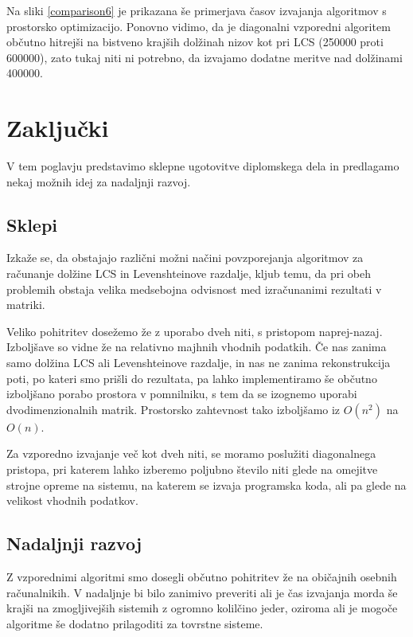 \documentclass[a4paper,12pt,openright]{book}
\begin{document}
Na sliki \ref{comparison6} je prikazana še primerjava časov izvajanja algoritmov s prostorsko optimizacijo. Ponovno vidimo, da je diagonalni vzporedni algoritem občutno hitrejši na bistveno krajših dolžinah nizov kot pri LCS (250000 proti 600000), zato tukaj niti ni potrebno, da izvajamo dodatne meritve nad dolžinami 400000. 



\chapter{Zaključki}

V tem poglavju predstavimo sklepne ugotovitve diplomskega dela in predlagamo nekaj možnih idej za nadaljnji razvoj.

\section{Sklepi}

Izkaže se, da obstajajo različni možni načini povzporejanja algoritmov za računanje dolžine LCS in Levenshteinove razdalje, kljub temu, da pri obeh problemih obstaja velika medsebojna odvisnost med izračunanimi rezultati v matriki. 

Veliko pohitritev dosežemo že z uporabo dveh niti, s pristopom naprej-nazaj. Izboljšave so vidne že na relativno majhnih vhodnih podatkih. Če nas zanima samo dolžina LCS ali Levenshteinove razdalje, in nas ne zanima rekonstrukcija poti, po kateri smo prišli do rezultata, pa lahko implementiramo še občutno izboljšano porabo prostora v pomnilniku, s tem da se izognemo uporabi dvodimenzionalnih matrik. Prostorsko zahtevnost tako izboljšamo iz $O(n^2)$ na $O(n)$. 

Za vzporedno izvajanje več kot dveh niti, se moramo poslužiti diagonalnega pristopa, pri katerem lahko izberemo poljubno število niti glede na omejitve strojne opreme na sistemu, na katerem se izvaja programska koda, ali pa glede na velikost vhodnih podatkov. 

\section{Nadaljnji razvoj}

Z vzporednimi algoritmi smo dosegli občutno pohitritev že na običajnih osebnih računalnikih. V nadaljnje bi bilo zanimivo preveriti ali je čas izvajanja morda še krajši na zmogljivejših sistemih z ogromno kolilčino jeder, oziroma ali je mogoče algoritme še dodatno prilagoditi za tovrstne sisteme. 
\end{document}
